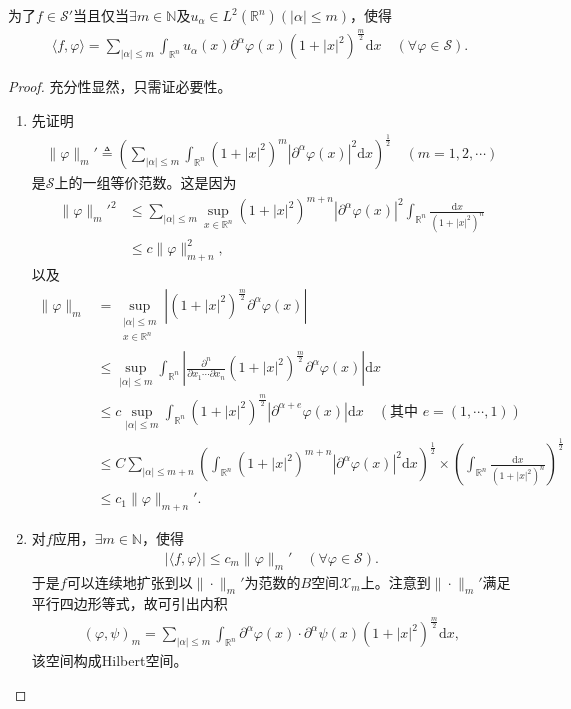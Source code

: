 \documentclass[../../main.tex]{subfiles}%
\begin{document}
\begin{theorem}
为了$f\in\mathscr{S}'$当且仅当$\exists m\in\mathbb{N}$及$u_\alpha\in L^2(\mathbb{R}^n)(|\alpha|\leqslant m)$，使得
\begin{align*}
\langle f,\varphi\rangle=\sum\limits_{|\alpha|\leqslant m}\int_{\mathbb{R}^n}u_\alpha(x)\partial^\alpha\varphi(x)(1+|x|^2)^{\frac{m}{2}}\mathrm{d}x\quad(\forall\varphi\in\mathscr{S}).
\end{align*}
\end{theorem}
\begin{proof}
充分性显然，只需证必要性。
\begin{enumerate}[(1)]
\item 先证明
\begin{align*}
\|\varphi\|_m'\triangleq\left(\sum\limits_{|\alpha|\leqslant m}\int_{\mathbb{R}^n}(1+|x|^2)^m|\partial^\alpha\varphi(x)|^2\mathrm{d}x\right)^{\frac{1}{2}}\quad(m=1,2,\cdots)
\end{align*}
是$\mathscr{S}$上的一组等价范数。这是因为
\begin{align*}
\|\varphi\|_m'^2&\leqslant\sum\limits_{|\alpha|\leqslant m}\sup\limits_{x\in\mathbb{R}^n}(1+|x|^2)^{m+n}|\partial^\alpha\varphi(x)|^2\int_{\mathbb{R}^n}\frac{\mathrm{d}x}{(1+|x|^2)^n}\\
&\leqslant c\|\varphi\|_{m+n}^2,
\end{align*}
以及
\begin{align*}
\|\varphi\|_m&=\sup\limits_{\substack{|\alpha|\leqslant m\\x\in\mathbb{R}^n}}\left|(1+|x|^2)^{\frac{m}{2}}\partial^\alpha\varphi(x)\right|\\
&\leqslant\sup\limits_{|\alpha|\leqslant m}\int_{\mathbb{R}^n}\left|\frac{\partial^n}{\partial x_1\cdots\partial x_n}(1+|x|^2)^{\frac{m}{2}}\partial^\alpha\varphi(x)\right|\mathrm{d}x\\
&\leqslant c\sup\limits_{|\alpha|\leqslant m}\int_{\mathbb{R}^n}(1+|x|^2)^{\frac{m}{2}}|\partial^{\alpha+e}\varphi(x)|\mathrm{d}x\quad(\text{其中 }e=(1,\cdots,1))\\
&\leqslant C\sum\limits_{|\alpha|\leqslant m+n}\left(\int_{\mathbb{R}^n}(1+|x|^2)^{m+n}|\partial^\alpha\varphi(x)|^2\mathrm{d}x\right)^{\frac{1}{2}}\times\left(\int_{\mathbb{R}^n}\frac{\mathrm{d}x}{(1+|x|^2)^n}\right)^{\frac{1}{2}}\\
&\leqslant c_1\|\varphi\|_{m+n}'.
\end{align*}

\item 对$f$应用，$\exists m\in\mathbb{N}$，使得
\begin{align}
|\langle f,\varphi\rangle|\leqslant c_m\|\varphi\|_m'\quad(\forall\varphi\in\mathscr{S}).\label{eq:4-2-6}
\end{align}
于是$f$可以连续地扩张到以$\|\cdot\|_m'$为范数的$B$空间$\mathscr{X}_m$上。注意到$\|\cdot\|_m'$满足平行四边形等式，故可引出内积
\begin{align*}
(\varphi,\psi)_m=\sum\limits_{|\alpha|\leqslant m}\int_{\mathbb{R}^n}\partial^\alpha\varphi(x)\cdot\partial^\alpha\psi(x)(1+|x|^2)^{\frac{m}{2}}\mathrm{d}x,
\end{align*}
该空间构成Hilbert空间。


\end{enumerate}
\end{proof}
\end{document}

